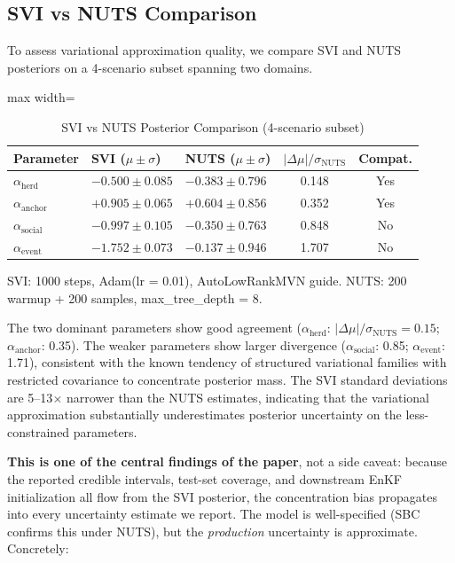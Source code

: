 \documentclass[12pt]{article}
\begin{document}
\subsection{SVI vs NUTS Comparison}
\label{sec:svi_nuts}

To assess variational approximation quality, we compare SVI and NUTS posteriors on a 4-scenario subset spanning two domains.

\begin{table}[H]
\centering
\caption{SVI vs NUTS Posterior Comparison (4-scenario subset)}
\label{tab:svi_nuts}
\begin{adjustbox}{max width=\textwidth}
\begin{tabular}{@{}lllcc@{}}
\toprule
Parameter & SVI ($\mu \pm \sigma$) & NUTS ($\mu \pm \sigma$) & $|\Delta\mu|/\sigma_{\text{NUTS}}$ & Compat. \\
\midrule
$\alpha_{\text{herd}}$ & $-0.500 \pm 0.085$ & $-0.383 \pm 0.796$ & 0.148 & Yes \\
$\alpha_{\text{anchor}}$ & $+0.905 \pm 0.065$ & $+0.604 \pm 0.856$ & 0.352 & Yes \\
$\alpha_{\text{social}}$ & $-0.997 \pm 0.105$ & $-0.350 \pm 0.763$ & 0.848 & No \\
$\alpha_{\text{event}}$ & $-1.752 \pm 0.073$ & $-0.137 \pm 0.946$ & 1.707 & No \\
\bottomrule
\end{tabular}
\end{adjustbox}

\vspace{4pt}
\footnotesize
SVI: 1000 steps, Adam(lr = 0.01), AutoLowRankMVN guide. NUTS: 200 warmup + 200 samples, max\_tree\_depth = 8.
\end{table}

The two dominant parameters show good agreement ($\alpha_{\text{herd}}$: $|\Delta\mu|/\sigma_{\text{NUTS}} = 0.15$; $\alpha_{\text{anchor}}$: 0.35). The weaker parameters show larger divergence ($\alpha_{\text{social}}$: 0.85; $\alpha_{\text{event}}$: 1.71), consistent with the known tendency of structured variational families with restricted covariance to concentrate posterior mass. The SVI standard deviations are 5--13$\times$ narrower than the NUTS estimates, indicating that the variational approximation substantially underestimates posterior uncertainty on the less-constrained parameters.

\textbf{This is one of the central findings of the paper}, not a side caveat: because the reported credible intervals, test-set coverage, and downstream EnKF initialization all flow from the SVI posterior, the concentration bias propagates into every uncertainty estimate we report. The model is well-specified (SBC confirms this under NUTS), but the \emph{production} uncertainty is approximate. Concretely:
\end{document}
